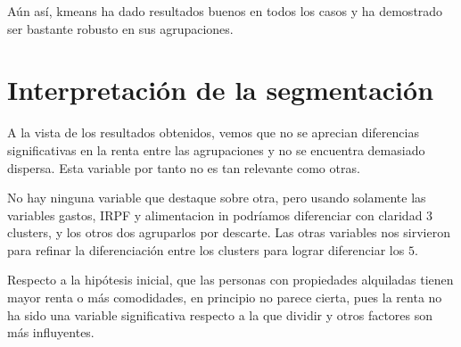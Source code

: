 Aún así, kmeans ha dado resultados buenos en todos los casos y ha demostrado ser bastante robusto en sus agrupaciones.



\section{Interpretación de la segmentación}

A la vista de los resultados obtenidos, vemos que no se aprecian diferencias significativas en la renta entre las agrupaciones y no se encuentra demasiado dispersa. Esta variable por tanto no es tan relevante como otras.

No hay ninguna variable que destaque sobre otra, pero usando solamente las variables gastos, IRPF y alimentacion in podríamos diferenciar con claridad 3 clusters, y los otros dos agruparlos por descarte. Las otras variables nos sirvieron para refinar la diferenciación entre los clusters para lograr diferenciar los $5$.

Respecto a la hipótesis inicial, que las personas con propiedades alquiladas tienen mayor renta o más comodidades, en principio no parece cierta, pues la renta no ha sido una variable significativa respecto a la que dividir y otros factores son más influyentes.




